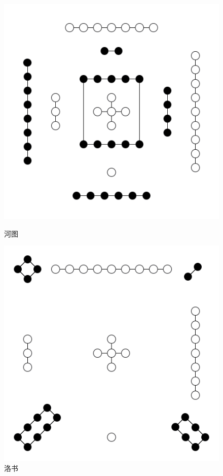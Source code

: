         \begin{figure}[!h]
            \centering
            \begin{minipage}[t]{.4\linewidth}
                \centering
                \includegraphics[width=.8\linewidth]{comb_notes/chap0_inc/河图.png}
                \caption{河图}
                \label{fig:0:hetu}
            \end{minipage}
            \begin{minipage}[t]{.4\linewidth}
                \centering
                \includegraphics[width=.8\linewidth]{comb_notes/chap0_inc/洛书.png}
                \caption{洛书}
                \label{fig:0:luoshu}
            \end{minipage}
        \end{figure}


